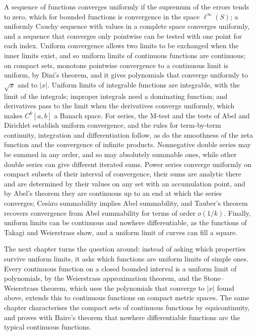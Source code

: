 \bigskip
A sequence of functions converges uniformly if the supremum of the errors tends to zero, which for bounded functions is convergence in the space $\ell^\infty(S)$; a uniformly Cauchy sequence with values in a complete space converges uniformly, and a sequence that converges only pointwise can be tested with one point for each index. Uniform convergence allows two limits to be exchanged when the inner limits exist, and so uniform limits of continuous functions are continuous; on compact sets, monotone pointwise convergence to a continuous limit is uniform, by Dini's theorem, and it gives polynomials that converge uniformly to $\sqrt x$ and to $|x|$. Uniform limits of integrable functions are integrable, with the limit of the integrals; improper integrals need a dominating function; and derivatives pass to the limit when the derivatives converge uniformly, which makes $C^k[a,b]$ a Banach space. For series, the M-test and the tests of Abel and Dirichlet establish uniform convergence, and the rules for term-by-term continuity, integration and differentiation follow, as do the smoothness of the zeta function and the convergence of infinite products. Nonnegative double series may be summed in any order, and so may absolutely summable ones, while other double series can give different iterated sums. Power series converge uniformly on compact subsets of their interval of convergence, their sums are analytic there and are determined by their values on any set with an accumulation point, and by Abel's theorem they are continuous up to an end at which the series converges; Ces\`aro summability implies Abel summability, and Tauber's theorem recovers convergence from Abel summability for terms of order $o(1/k)$. Finally, uniform limits can be continuous and nowhere differentiable, as the functions of Takagi and Weierstrass show, and a uniform limit of curves can fill a square.

The next chapter turns the question around: instead of asking which properties survive uniform limits, it asks which functions are uniform limits of simple ones. Every continuous function on a closed bounded interval is a uniform limit of polynomials, by the Weierstrass approximation theorem, and the Stone--Weierstrass theorem, which uses the polynomials that converge to $|x|$ found above, extends this to continuous functions on compact metric spaces. The same chapter characterises the compact sets of continuous functions by equicontinuity, and proves with Baire's theorem that nowhere differentiable functions are the typical continuous functions.


